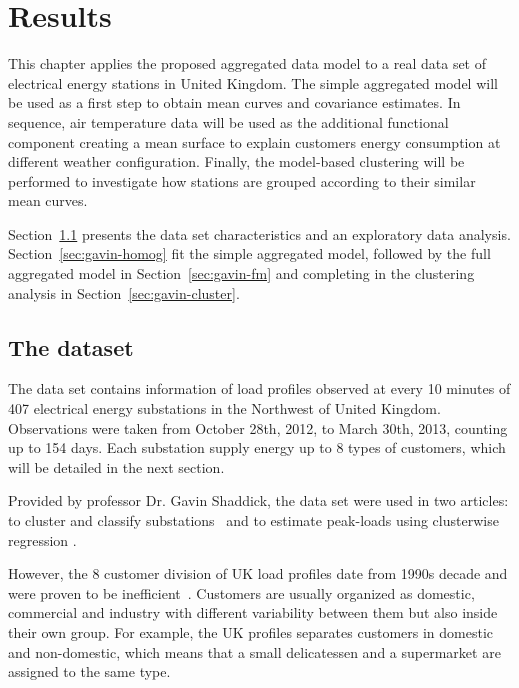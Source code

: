 



\chapter{Results}
\label{chap:results}

This chapter applies the proposed aggregated data model to a real data set of electrical energy stations in United Kingdom. The simple aggregated model will be used as a first step to obtain  mean curves and covariance estimates. In sequence, air temperature data will be used as the additional functional component creating a mean surface to explain customers energy consumption at different weather configuration. Finally, the model-based clustering will be performed to investigate how stations are grouped according to their similar mean curves.

Section~\ref{sec:res-dataset} presents the data set characteristics and an exploratory data analysis. Section~\ref{sec:gavin-homog} fit the simple aggregated model, followed by the full aggregated model in Section~\ref{sec:gavin-fm} and completing in the clustering analysis in Section~\ref{sec:gavin-cluster}.



\section{The dataset}
\label{sec:res-dataset}

The data set contains information of load profiles observed at every 10 minutes of 407 electrical energy substations in the Northwest of United Kingdom. Observations were taken from October 28th, 2012, to March 30th, 2013, counting up to 154 days. Each substation supply energy up to 8 types of customers, which will be detailed in the next section.

Provided by professor Dr. Gavin Shaddick, the data set were used in two articles: to cluster and classify substations~\cite{li2015development1} and to estimate peak-loads using clusterwise regression \cite{li2015development2}.

However, the 8 customer division of UK load profiles date from 1990s decade and were proven to be inefficient~\cite{wilks2010demand}. Customers are usually organized as domestic, commercial and industry with different variability between them but also inside their own group. For example, the UK profiles separates customers in domestic and non-domestic, which means that a small delicatessen and a supermarket are assigned to the same type.

